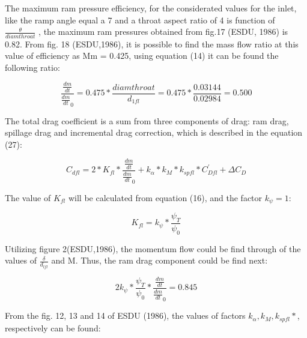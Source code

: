 The maximum ram pressure efficiency, for the considerated values for the inlet, like the ramp angle equal a 7 and a throat aspect ratio of 4 is function of \begin{math} \frac{\theta}{diamthroat} \end{math} , the maximum ram pressures obtained from fig.17 (ESDU, 1986) is 0.82. From fig. 18 (ESDU,1986), it is possible to find the mass flow ratio at this value of efficiency as Mm = 0.425, using equation (14) it can be found the following ratio:

\begin{equation}
   \frac{\frac{dm}{dt}}{\frac{dm}{dt}_0} = 0.475*\frac{diamthroat}{d_{1fl}} =  0.475*\frac{0.03144}{0.02984} = 0.500
\end{equation}
 
The total drag coefficient is a sum from three components of drag: ram drag, spillage drag and incremental drag correction, which is described in the equation (27):

\begin{equation}
    C_{dfl} = 2*K_{fl}*\frac{\frac{dm}{dt}}{\frac{dm}{dt}_0} + k_{\alpha}*k_{M}*k_{spfl}*C_{Dfl}^{'} + \Delta C_D
\end{equation}

The value of \begin{math} K_{fl} \end{math} will be calculated from equation (16), and the factor \begin{math} k_{\psi} = 1 \end{math}:

\begin{equation}
    K_{fl} = k_{\psi}*\frac{\psi_{T}}{\psi_{0}}
\end{equation}

Utilizing figure 2(ESDU,1986), the momentum flow could be find through of the values of \begin{math} \frac{\delta}{d_{lfl}} \end{math} and M. Thus, the ram drag component could be find next:

\begin{equation}
     2k_{\psi}*\frac{\psi_{T}}{\psi_{0}}*\frac{\frac{dm}{dt}}{\frac{dm}{dt}_0} = 0.845
\end{equation}

From the fig. 12, 13 and 14 of ESDU (1986), the values of factors \begin{math}  k_{\alpha}, k_{M}, k_{spfl}* \end{math}, respectively can be found:

